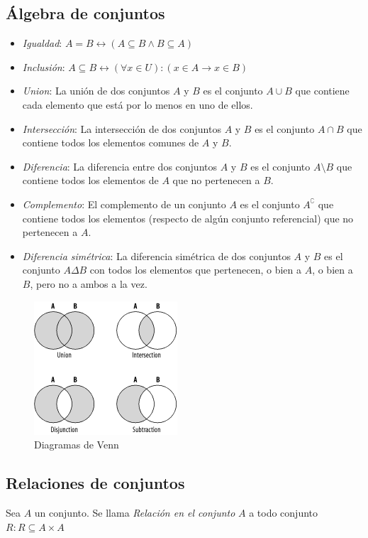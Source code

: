 \subsection{Álgebra de conjuntos}
\begin{itemize}
	\item \emph{Igualdad}: $ A = B \leftrightarrow (A \subseteq B \wedge B \subseteq A)$
	\item \emph{Inclusión}: $A \subseteq B \leftrightarrow (\forall x \in U):(x \in A \rightarrow x \in B)$
	\item \emph{Union}: La unión de dos conjuntos $A$ y $B$ es el conjunto $A \cup B$ que contiene cada elemento que está por lo menos en uno de ellos.
	
	\item \emph{Intersección}: La intersección de dos conjuntos $A$ y $B$ es el conjunto $A \cap B$ que contiene todos los elementos comunes de $A$ y $B$.
	
	\item \emph{Diferencia}: La diferencia entre dos conjuntos $A$ y $B$ es el conjunto $A \setminus B$ que contiene todos los elementos de $A$ que no pertenecen a $B$.
	
	\item \emph{Complemento}: El complemento de un conjunto $A$ es el conjunto $A^\complement$ que contiene todos los elementos (respecto de algún conjunto referencial) que no pertenecen a $A$.
	
	\item \emph{Diferencia simétrica}: La diferencia simétrica de dos conjuntos $A$ y $B$ es el conjunto $A \Delta B$ con todos los elementos que pertenecen, o bien a $A$, o bien a $B$, pero no a ambos a la vez.
\end{itemize}

\begin{figure}[H]
	\centering
	\includegraphics{set.png}
	\caption{Diagramas de Venn}
	\label{fig:set}
\end{figure}

\subsection{Relaciones de conjuntos}
Sea $A$ un conjunto. Se llama \emph{Relación en el conjunto} $A$ a todo 
conjunto $R:R \subseteq A \times A$

